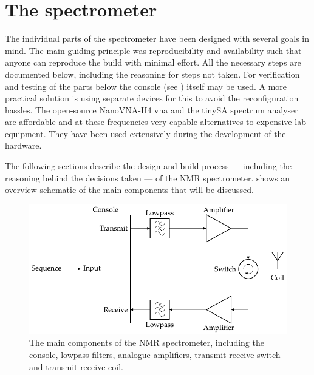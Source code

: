 
\chapter{The spectrometer}

The individual parts of the spectrometer have been designed with several goals in mind. The main guiding principle was reproducibility and availability such that anyone can reproduce the build with minimal effort. All the necessary steps are documented below, including the reasoning for steps not taken. For verification and testing of the parts below the console (see ) itself may be used. A more practical solution is using separate devices for this to avoid the reconfiguration hassles. The open-source NanoVNA-H4 \acrshort{vna} and the tinySA spectrum analyser are affordable and at these frequencies very capable alternatives to expensive lab equipment. They have been used extensively during the development of the hardware.

The following sections describe the design and build process --- including the reasoning behind the decisions taken --- of the \magnethical{} NMR spectrometer.  shows an overview schematic of the main components that will be discussed.

\begin{figure}[hbt]
    \centering
    \includegraphics{images/block_diagram.pdf}
    \caption{ The main components of the \magnethical{} NMR spectrometer, including the console, lowpass filters, analogue amplifiers, transmit-receive switch and transmit-receive coil.}
\end{figure}

